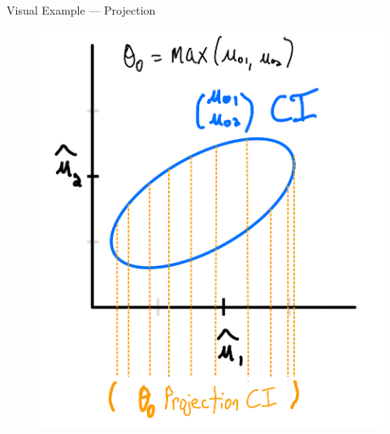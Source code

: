 \documentclass[aspectratio=169, professionalfonts]{beamer}
\begin{document}
\begin{frame}{Visual Example --- Projection}
	\begin{figure}
		\includegraphics[width=.5\textwidth]{figures/sketch-projection}
	\end{figure}
\end{frame}
\end{document}
